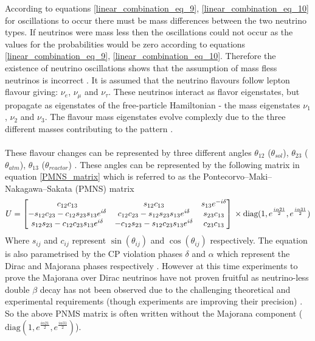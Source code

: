According to equations \ref{linear_combination_eq_9}, \ref{linear_combination_eq_10} for oscillations to occur there must be mass differences between the two neutrino types. If neutrinos were mass less then the oscillations could not occur as the values for the probabilities would be zero according to equations \ref{linear_combination_eq_9}, \ref{linear_combination_eq_10}. Therefore the existence of neutrino oscillations shows that the assumption of mass fless neutrinos is incorrect \cite{griffiths2008book}\cite{griffiths2008neutrinoOscillations} \cite{sassaroli1999neutrino}. It is assumed that the neutrino flavours follow lepton flavour giving: $\nu_e$, $\nu_\mu$ and $\nu_\tau$. These neutrinos interact as flavor eigenstates, but propagate as eigenstates of the free-particle Hamiltonian - the mass eigenstates $\nu_1$, $\nu_2$ and $\nu_3$. The flavour mass eigenstates evolve complexly due to the three different masses contributing to the pattern  \cite{griffiths2008book} \cite{griffiths2008neutrinoOscillations}. 
\\\\These flavour changes can be represented by three different angles $\theta_{12}$ ($\theta_{sol}$), $\theta_{23}$ ($\theta_{atm}$), $\theta_{13}$ ($\theta_{reactor}$) \cite{Olive_2014} \cite{griffiths2008book} \cite{griffiths2008neutrinoOscillations}. These angles can be represented by the following  matrix in equation \ref{PMNS_matrix} which is referred to as the Pontecorvo–Maki–Nakagawa–Sakata (PMNS) matrix
\begin{equation}
U
    =
    \begin{bmatrix}
        c_{12}c_{13} & s_{12}c_{13} & s_{13}e^{-i\delta}\\
        -s_{12}c_{23} - c_{12}s_{23}s_{13}e^{i\delta} & c_{12}c_{23} - s_{12}s_{23}s_{13}e^{i\delta} & s_{23}c_{13} \\
        s_{12}s_{23} - c_{12}c_{23}s_{13}e^{i\delta} & -c_{12}s_{23} - s_{12}c_{23}s_{13}e^{i\delta} & c_{23}c_{13} 
    \end{bmatrix}
    \\ \times \text{diag}(1, e^{\frac{i\alpha21}{2}} , e^{\frac{i\alpha31}{2}})
    \label{PMNS_matrix}
\end{equation}
Where $s_{ij}$ and $c_{ij}$ represent $\sin(\theta_{ij})$ and $\cos(\theta_{ij})$ respectively. The equation is also parametrised by the CP violation phases $\delta$ and $\alpha$ which represent the Dirac and Majorana phases respectively \cite{Olive_2014}. However at this time experiments to prove the Majorana over Dirac neutrinos have not proven fruitful as neutrino-less double $\beta$ decay has not been observed due to the challenging theoretical and experimental requirements (though experiments are improving their precision) \cite{Cardani_2019}.  So the above PNMS matrix is often written without the Majorana component ($\text{diag}(1, e^{\frac{i\alpha21}{2}} , e^{\frac{i\alpha31}{2}})$). 
